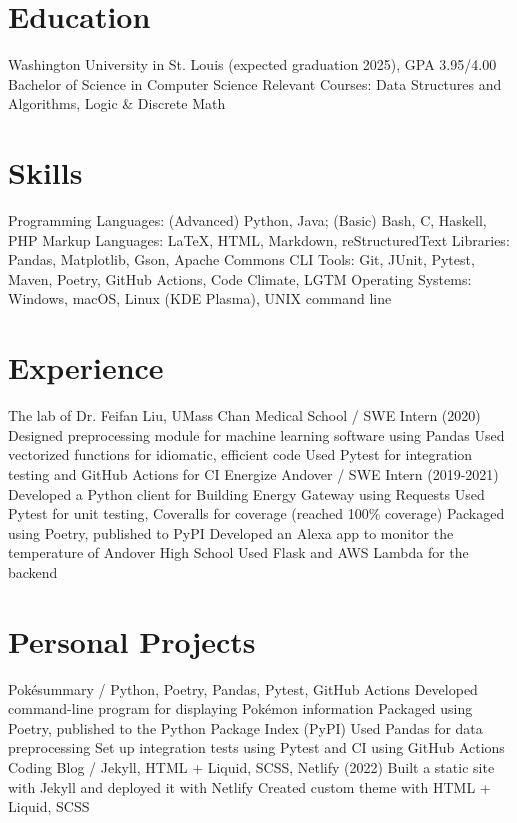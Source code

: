 \section{Education}
\begin{outline}
\1 Washington University in St. Louis (expected graduation 2025),  GPA 3.95/4.00
    \2 Bachelor of Science in Computer Science
    \2 Relevant Courses: Data Structures and Algorithms, Logic \& Discrete Math
\end{outline}


\section{Skills}
\begin{outline}
\1 Programming Languages: (Advanced) Python, Java; (Basic) Bash, C, Haskell, PHP 
\1 Markup Languages: \LaTeX, HTML, Markdown, reStructuredText 
\1 Libraries: Pandas, Matplotlib, Gson, Apache Commons CLI 
\1 Tools: Git, JUnit, Pytest, Maven, Poetry, GitHub Actions, Code Climate, LGTM 
\1 Operating Systems: Windows, macOS, Linux (KDE Plasma), UNIX command line 
\end{outline}

\section{Experience}
\begin{outline}
\1 The lab of Dr. Feifan Liu, UMass Chan Medical School / SWE Intern (2020)
    \2 Designed preprocessing module for machine learning software using Pandas
    \2 Used vectorized functions for idiomatic, efficient code
    \2 Used Pytest for integration testing and GitHub Actions for CI
\1 Energize Andover / SWE Intern (2019-2021)
    \2 Developed a Python client for Building Energy Gateway using Requests
    \2 Used Pytest for unit testing, Coveralls for coverage (reached 100\% coverage)
    \2 Packaged using Poetry, published to PyPI
    \2 Developed an Alexa app to monitor the temperature of Andover High School
    \2 Used Flask and AWS Lambda for the backend
\end{outline}


\section{Personal Projects}
\begin{outline}
\1 Pokésummary / Python, Poetry, Pandas, Pytest, GitHub Actions
    \2 Developed command-line program for displaying Pokémon information
    \2 Packaged using Poetry, published to the Python Package Index (PyPI)
    \2 Used Pandas for data preprocessing
    \2 Set up integration tests using Pytest and CI using GitHub Actions
\1 Coding Blog / Jekyll, HTML + Liquid, SCSS, Netlify (2022)
    \2 Built a static site with Jekyll and deployed it with Netlify
    \2 Created custom theme with HTML + Liquid, SCSS
\end{outline}


